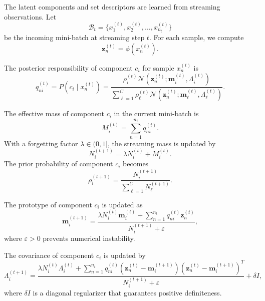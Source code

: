 \documentclass{article}
\theoremstyle{plain}
\theoremstyle{definition}
\theoremstyle{remark}
\begin{document}
The latent components and set descriptors are learned from streaming observations. Let
\[
\mathcal B_t
=
\{x_1^{(t)},x_2^{(t)},\ldots,x_{n_t}^{(t)}\}
\]
be the incoming mini-batch at streaming step \(t\). For each sample, we compute
\[
\mathbf z_n^{(t)}
=
\phi(x_n^{(t)}).
\]

The posterior responsibility of component \(c_i\) for sample \(x_n^{(t)}\) is
\begin{equation}
	\label{eq:responsibility_stream}
	q_{ni}^{(t)}
	=
	P(c_i\mid x_n^{(t)})
	=
	\frac{
		\rho_i^{(t)}
		\mathcal N(\mathbf z_n^{(t)};\mathbf m_i^{(t)},\Lambda_i^{(t)})
	}{
		\sum_{\ell=1}^{C}
		\rho_\ell^{(t)}
		\mathcal N(\mathbf z_n^{(t)};\mathbf m_\ell^{(t)},\Lambda_\ell^{(t)})
	}.
\end{equation}

The effective mass of component \(c_i\) in the current mini-batch is
\begin{equation}
	\label{eq:effective_mass}
	M_i^{(t)}
	=
	\sum_{n=1}^{n_t}
	q_{ni}^{(t)}.
\end{equation}
With a forgetting factor \(\lambda\in(0,1]\), the streaming mass is updated by
\begin{equation}
	\label{eq:streaming_mass}
	N_i^{(t+1)}
	=
	\lambda N_i^{(t)}
	+
	M_i^{(t)}.
\end{equation}
The prior probability of component \(c_i\) becomes
\begin{equation}
	\label{eq:rho_update}
	\rho_i^{(t+1)}
	=
	\frac{
		N_i^{(t+1)}
	}{
		\sum_{\ell=1}^{C}N_\ell^{(t+1)}
	}.
\end{equation}

The prototype of component \(c_i\) is updated as
\begin{equation}
	\label{eq:prototype_update}
	\mathbf m_i^{(t+1)}
	=
	\frac{
		\lambda N_i^{(t)}\mathbf m_i^{(t)}
		+
		\sum_{n=1}^{n_t}
		q_{ni}^{(t)}\mathbf z_n^{(t)}
	}{
		N_i^{(t+1)}+\varepsilon
	},
\end{equation}
where \(\varepsilon>0\) prevents numerical instability.

The covariance of component \(c_i\) is updated by
\begin{equation}
	\label{eq:covariance_update}
	\Lambda_i^{(t+1)}
	=
	\frac{
		\lambda N_i^{(t)}\Lambda_i^{(t)}
		+
		\sum_{n=1}^{n_t}
		q_{ni}^{(t)}
		\left(
		\mathbf z_n^{(t)}-\mathbf m_i^{(t+1)}
		\right)
		\left(
		\mathbf z_n^{(t)}-\mathbf m_i^{(t+1)}
		\right)^T
	}{
		N_i^{(t+1)}+\varepsilon
	}
	+
	\delta I,
\end{equation}
where \(\delta I\) is a diagonal regularizer that guarantees positive definiteness.
\end{document}
